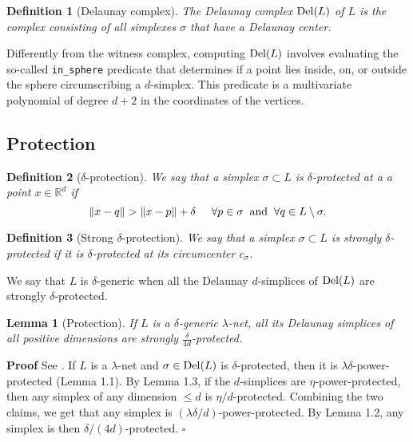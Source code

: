 \documentclass[11pt,a4paper]{article}
\newtheorem{definition}{Definition}
\newtheorem{lemma}{Lemma}
\newenvironment{proof}
        {\noindent \textbf{Proof} \hspace{0.3mm}}
        {\hspace{0.3mm}$\square$  \smallskip}
\newcommand{\R}{\mathbb R}
\newcommand{\del}{{\rm Del}}
\begin{document}
\begin{definition}[Delaunay complex]
The Delaunay complex $\del (L)$ of $L$ is the complex consisting of
all simplexes $\sigma$ that have  a Delaunay center.
\end{definition}

Differently from the witness complex, computing $\del(L)$ involves
evaluating the so-called {\tt in\_sphere} predicate that determines if
a point lies inside, on, or outside the sphere circumscribing a
$d$-simplex.
This predicate is a multivariate polynomial of degree $d+2$ in the
coordinates of the vertices.

\subsection{Protection}

\begin{definition}[$\delta$-protection]
We say that a simplex $\sigma \subset L$ is $\delta$-protected  at a 
a point $x\in \R^d$  if
\[ \| x- q\| >  \| x-p\|  +\delta \;\;\;\;\; \forall p \in \sigma\;\;
{\rm  and} \;\;  \forall  q\in L\setminus \sigma.\]
\end{definition}



\begin{definition}[Strong $\delta$-protection]
We say that a simplex $\sigma \subset L$ is strongly $\delta$-protected if 
it is $\delta$-protected at its circumcenter $c_{\sigma}$.%
\end{definition}

We say that $L$ is $\delta$-generic when all the Delaunay
$d$-simplices of $\del (L)$ are strongly $\delta$-protected.

\begin{lemma}[Protection]
\label{lemma-protection}
If $L$ is a $\delta$-generic $\lambda$-net, all its Delaunay simplices of all
positive dimensions are strongly $\frac{\delta}{4d}$-protected.
\end{lemma}

\begin{proof}
See \cite{BDGO}. If $L$ is a $\lambda$-net and $\sigma\in \del (L)$ is
$\delta$-protected, then it is $\lambda\delta$-power-protected (Lemma
1.1). By Lemma 1.3, if the $d$-simplices are $\eta$-power-protected,
then any simplex of any dimension $\leq d$ is
$\eta/d$-protected. Combining the two claims, we get that any
simplex is $(\lambda\delta/d)$-power-protected. By Lemma 1.2, any
simplex is then $\delta/(4d)$-protected.
\end{proof}
\end{document}
